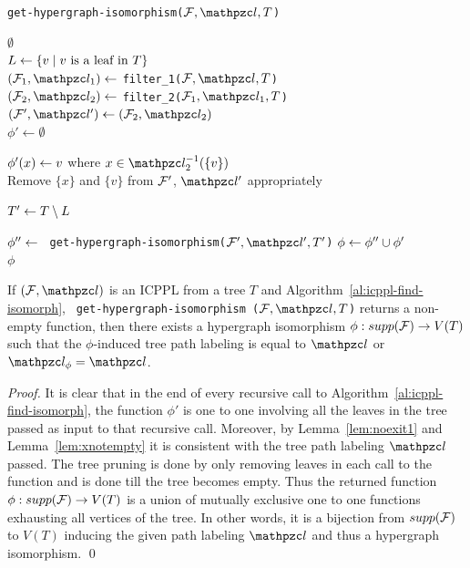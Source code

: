 \documentclass[MS]             %
              {iitmdiss_as}    %
\begin{document}
\begin{algorithm}[h]
  \caption{{\tt get-hypergraph-isomorphism($\cF, \cl, T$)}}
  \label{al:icppl-find-isomorph}
  \begin{algorithmic}[\lndisplay]

    \RETURN $\emptyset$\\
    \ENDIF
    \STATE $L \leftarrow \{v \mid v \text{ is a leaf in }      T\}$\\
    \STATE $(\cF_1, \cl_1) \assign$ {\tt filter\_1($\cF, \cl,
      T$)}\\
    \STATE $(\cF_2, \cl_2) \assign$ {\tt filter\_2($\cF_1,
      \cl_1, T$)}\\

    \STATE $(\cF', \cl') \assign (\cF_2, \cl_2)$\\
    \STATE $\phi' \leftarrow \emptyset$

    \STATE $\phi'(x) \leftarrow v$ where $x \in \cl_2^{-1}(\{v\})$
    \\
    \STATE Remove $\{x\}$ and $\{v\}$ from ${\cal F}'$, $\cl'$  appropriately\\
    \ENDFOR

    \STATE $T' \leftarrow T \setminus L$

    \STATE $\phi'' \leftarrow$ {\tt
      get-hypergraph-isomorphism($\cF', \cl', T'$)}
    \STATE $\phi \leftarrow \phi'' \cup \phi'$ \\
    \RETURN $\phi$
  \end{algorithmic}
\end{algorithm}

\begin{lemma}
  \label{lem:hyperiso}  %
  If $(\cF, \cl)$ is an ICPPL from a tree $T$ and
  Algorithm~\ref{al:icppl-find-isomorph}, {\tt
    get-hypergraph-isomorphism ($\cF, \cl, T$)} returns a non-empty
  function, then there exists a hypergraph isomorphism $\phi :
  supp({\cal F}) \rightarrow V(T)$ such that the $\phi$-induced tree path
  labeling is equal to $\cl$ or $\cl_\phi = \cl$.
\end{lemma}
\begin{proof}
  It is clear that in the end of every recursive call to
  Algorithm~\ref{al:icppl-find-isomorph}, the function $\phi'$ is one
  to one involving all the leaves in the tree passed as input to that
  recursive call. Moreover, by Lemma~\ref{lem:noexit1} and
  Lemma~\ref{lem:xnotempty} it is consistent with the tree path
  labeling $\cl$ passed. The tree pruning is done by only removing
  leaves in each call to the function and is done till the tree
  becomes empty. Thus the returned function $\phi: supp({\cal F})
  \rightarrow V(T)$ is a union of mutually exclusive one to one
  functions exhausting all vertices of the tree. In other words, it is
  a bijection from $supp({\cal F})$ to $V(T)$ inducing the given path
  labeling $\cl$ and thus a hypergraph isomorphism. \qed
\end{proof}
\end{document}
